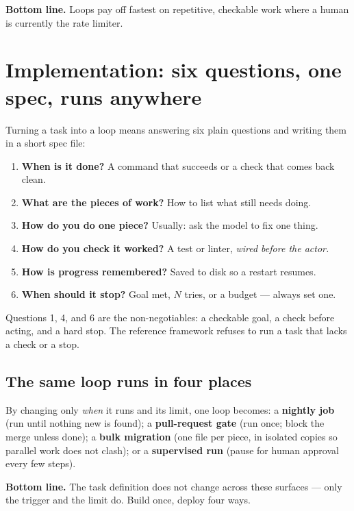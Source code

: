 \documentclass[11pt]{article}
\newcommand{\sotag}[1]{\textcolor{mckblue}{\textbf{#1}}}
\begin{document}
\begin{bottomline}
\textbf{Bottom line.} Loops pay off fastest on repetitive, checkable work where a
human is currently the rate limiter.
\end{bottomline}

\section{Implementation: six questions, one spec, runs anywhere}
Turning a task into a loop means answering six plain questions and writing them
in a short spec file:
\begin{enumerate}
\item \textbf{When is it done?} A command that succeeds or a check that comes back clean.
\item \textbf{What are the pieces of work?} How to list what still needs doing.
\item \textbf{How do you do one piece?} Usually: ask the model to fix one thing.
\item \textbf{How do you check it worked?} A test or linter, \emph{wired before the actor.}
\item \textbf{How is progress remembered?} Saved to disk so a restart resumes.
\item \textbf{When should it stop?} Goal met, $N$ tries, or a budget --- always set one.
\end{enumerate}
Questions 1, 4, and 6 are the non-negotiables: a checkable goal, a check before
acting, and a hard stop. The reference framework refuses to run a task that
lacks a check or a stop.

\subsection{The same loop runs in four places}
By changing only \emph{when} it runs and its limit, one loop becomes: a
\sotag{nightly job} (run until nothing new is found); a \sotag{pull-request
gate} (run once; block the merge unless done); a \sotag{bulk migration} (one
file per piece, in isolated copies so parallel work does not clash); or a
\sotag{supervised run} (pause for human approval every few steps).

\begin{bottomline}
\textbf{Bottom line.} The task definition does not change across these surfaces
--- only the trigger and the limit do. Build once, deploy four ways.
\end{bottomline}
\end{document}
